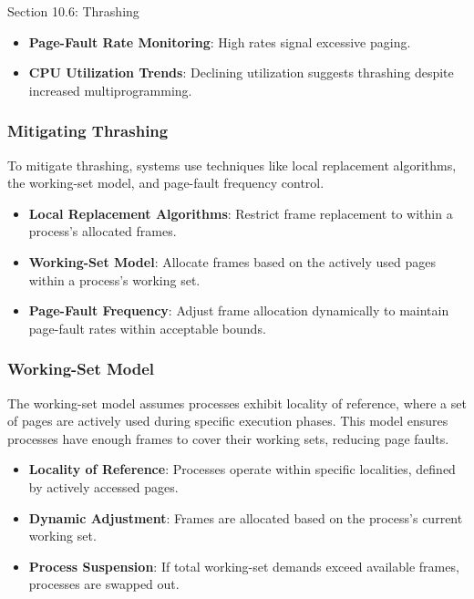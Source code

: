 \begin{notes}{Section 10.6: Thrashing}
    \begin{highlight}
        \begin{itemize}
            \item \textbf{Page-Fault Rate Monitoring}: High rates signal excessive paging.
            \item \textbf{CPU Utilization Trends}: Declining utilization suggests thrashing despite increased multiprogramming.
        \end{itemize}
    \end{highlight}
    
    \subsubsection*{Mitigating Thrashing}
    
    To mitigate thrashing, systems use techniques like local replacement algorithms, the working-set model, and page-fault frequency control.
    
    \begin{highlight}
        \begin{itemize}
            \item \textbf{Local Replacement Algorithms}: Restrict frame replacement to within a process's allocated frames.
            \item \textbf{Working-Set Model}: Allocate frames based on the actively used pages within a process's working set.
            \item \textbf{Page-Fault Frequency}: Adjust frame allocation dynamically to maintain page-fault rates within acceptable bounds.
        \end{itemize}
    \end{highlight}
    
    \subsubsection*{Working-Set Model}
    
    The working-set model assumes processes exhibit locality of reference, where a set of pages are actively used during specific execution phases. This model ensures processes have enough frames to cover 
    their working sets, reducing page faults.
    
    \begin{highlight}
        \begin{itemize}
            \item \textbf{Locality of Reference}: Processes operate within specific localities, defined by actively accessed pages.
            \item \textbf{Dynamic Adjustment}: Frames are allocated based on the process's current working set.
            \item \textbf{Process Suspension}: If total working-set demands exceed available frames, processes are swapped out.
        \end{itemize}
    \end{highlight}
    

\end{notes}
